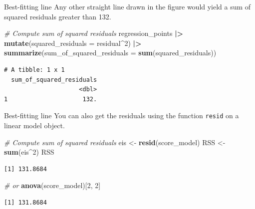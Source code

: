 \documentclass[
  ignorenonframetext,
]{beamer}
\newenvironment{Shaded}{\begin{snugshade}}{\end{snugshade}}
\newcommand{\AttributeTok}[1]{\textcolor[rgb]{0.13,0.29,0.53}{#1}}
\newcommand{\CommentTok}[1]{\textcolor[rgb]{0.56,0.35,0.01}{\textit{#1}}}
\newcommand{\DecValTok}[1]{\textcolor[rgb]{0.00,0.00,0.81}{#1}}
\newcommand{\FunctionTok}[1]{\textcolor[rgb]{0.13,0.29,0.53}{\textbf{#1}}}
\newcommand{\NormalTok}[1]{#1}
\newcommand{\OtherTok}[1]{\textcolor[rgb]{0.56,0.35,0.01}{#1}}
\newcommand{\SpecialCharTok}[1]{\textcolor[rgb]{0.81,0.36,0.00}{\textbf{#1}}}
\begin{document}
\begin{frame}[fragile]{Best-fitting line}
\protect\hypertarget{best-fitting-line-3}{}
Any other straight line drawn in the figure would yield a sum of squared
residuals greater than 132.

\normalsize

\begin{Shaded}
\begin{Highlighting}[]
\CommentTok{\# Compute sum of squared residuals}
\NormalTok{regression\_points }\SpecialCharTok{|\textgreater{}}
  \FunctionTok{mutate}\NormalTok{(}\AttributeTok{squared\_residuals =}\NormalTok{ residual}\SpecialCharTok{\^{}}\DecValTok{2}\NormalTok{) }\SpecialCharTok{|\textgreater{}}
  \FunctionTok{summarize}\NormalTok{(}\AttributeTok{sum\_of\_squared\_residuals =} \FunctionTok{sum}\NormalTok{(squared\_residuals))}
\end{Highlighting}
\end{Shaded}

\begin{verbatim}
# A tibble: 1 x 1
  sum_of_squared_residuals
                     <dbl>
1                     132.
\end{verbatim}

\normalsize
\end{frame}

\begin{frame}[fragile]{Best-fitting line}
\protect\hypertarget{best-fitting-line-4}{}
You can also get the residuals using the function \texttt{resid} on a
linear model object.

\normalsize

\begin{Shaded}
\begin{Highlighting}[]
\CommentTok{\# Compute sum of squared residuals}
\NormalTok{eis }\OtherTok{\textless{}{-}} \FunctionTok{resid}\NormalTok{(score\_model)}
\NormalTok{RSS }\OtherTok{\textless{}{-}} \FunctionTok{sum}\NormalTok{(eis}\SpecialCharTok{\^{}}\DecValTok{2}\NormalTok{)}
\NormalTok{RSS}
\end{Highlighting}
\end{Shaded}

\begin{verbatim}
[1] 131.8684
\end{verbatim}

\begin{Shaded}
\begin{Highlighting}[]
\CommentTok{\# or}
\FunctionTok{anova}\NormalTok{(score\_model)[}\DecValTok{2}\NormalTok{, }\DecValTok{2}\NormalTok{]}
\end{Highlighting}
\end{Shaded}

\begin{verbatim}
[1] 131.8684
\end{verbatim}

\normalsize
\end{frame}
\end{document}
